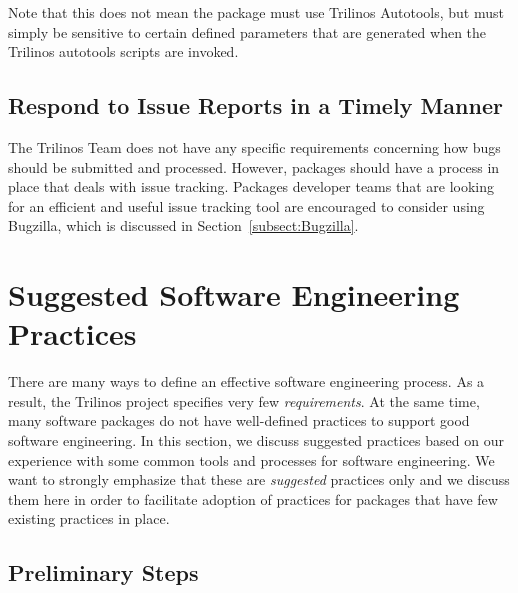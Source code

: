 \documentclass[12pt,strict]{TrilinosDevGuide}
\begin{document}
Note that this does not mean the package must use Trilinos Autotools,
but must simply be sensitive to certain defined parameters that are
generated when the Trilinos autotools scripts are invoked.

\subsection{Respond to Issue Reports in a Timely Manner}

The Trilinos Team does not have any specific requirements concerning how 
bugs should be submitted and processed.  However, packages should have a 
process in place that deals with issue tracking.  Packages developer teams 
that are looking for an efficient and useful issue tracking tool are 
encouraged to consider using Bugzilla, which is discussed in 
Section~\ref{subsect:Bugzilla}.

\section{Suggested Software Engineering Practices}
\label{Section:SuggestPractices}

\begin{minipage}[c]{\textwidth}

\begin{minipage}[l]{.6\textwidth}
There are many ways to define an effective software engineering
process.  As a result, the 
Trilinos project specifies very few {\it requirements}.  At the same time, 
many software packages do not have well-defined practices to support good 
software engineering.  In this section, we discuss suggested practices based 
on our experience with some common tools and processes for software 
engineering.  We want to strongly emphasize that these are {\it suggested} 
practices only and we discuss them here in order to facilitate adoption of 
practices for packages that have few existing practices in place.
\end{minipage}\hfill
{}
\end{minipage}

\subsection{Preliminary Steps}
\end{document}
